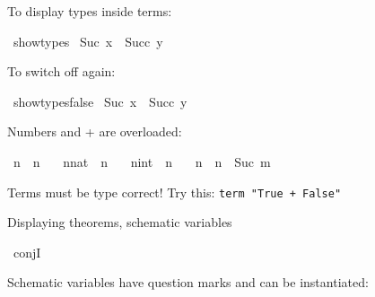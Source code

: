 \begin{isabellebody}
\begin{isamarkuptext}%
To display types inside terms:%
\end{isamarkuptext}\isamarkuptrue%
\isamarkupfalse%
\ {\isacharbrackleft}{\kern0pt}{\isacharbrackleft}{\kern0pt}show{\isacharunderscore}{\kern0pt}types{\isacharbrackright}{\kern0pt}{\isacharbrackright}{\kern0pt}\isanewline
{}\isamarkupfalse%
\ {\isachardoublequoteopen}Suc\ x\ {\isacharequal}{\kern0pt}\ Succ\ y{\isachardoublequoteclose}%
\begin{isamarkuptext}%
To switch off again:%
\end{isamarkuptext}\isamarkuptrue%
\isamarkupfalse%
\ {\isacharbrackleft}{\kern0pt}{\isacharbrackleft}{\kern0pt}show{\isacharunderscore}{\kern0pt}types{\isacharequal}{\kern0pt}false{\isacharbrackright}{\kern0pt}{\isacharbrackright}{\kern0pt}\isanewline
{}\isamarkupfalse%
\ {\isachardoublequoteopen}Suc\ x\ {\isacharequal}{\kern0pt}\ Succ\ y{\isachardoublequoteclose}%
\begin{isamarkuptext}%
Numbers and + are overloaded:%
\end{isamarkuptext}\isamarkuptrue%
\isamarkupfalse%
\ {\isachardoublequoteopen}n\ {\isacharplus}{\kern0pt}\ n\ {\isacharequal}{\kern0pt}\ {}{\isachardoublequoteclose}\isanewline
{}\isamarkupfalse%
\ {\isachardoublequoteopen}{\isacharparenleft}{\kern0pt}n{\isacharcolon}{\kern0pt}{\isacharcolon}{\kern0pt}nat{\isacharparenright}{\kern0pt}\ {\isacharplus}{\kern0pt}\ n\ {\isacharequal}{\kern0pt}\ {}{\isachardoublequoteclose}\isanewline
{}\isamarkupfalse%
\ {\isachardoublequoteopen}{\isacharparenleft}{\kern0pt}n{\isacharcolon}{\kern0pt}{\isacharcolon}{\kern0pt}int{\isacharparenright}{\kern0pt}\ {\isacharplus}{\kern0pt}\ n\ {\isacharequal}{\kern0pt}\ {}{\isachardoublequoteclose}\isanewline
{}\isamarkupfalse%
\ {\isachardoublequoteopen}n\ {\isacharplus}{\kern0pt}\ n\ {\isacharequal}{\kern0pt}\ Suc\ m{\isachardoublequoteclose}%
\begin{isamarkuptext}%
Terms must be type correct! Try this: \texttt{term "True + False"}%
\end{isamarkuptext}\isamarkuptrue%
%
\begin{isamarkuptext}%
Displaying theorems, schematic variables%
\end{isamarkuptext}\isamarkuptrue%
\isamarkupfalse%
\ conjI%
\begin{isamarkuptext}%
Schematic variables have question marks and can be instantiated:%

\end{isamarkuptext}
\end{isabellebody}
